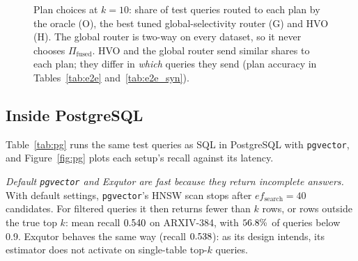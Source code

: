 \documentclass[sigconf,nonacm]{acmart}
\newcommand{\Ppre}{\Pi_{\text{pre}}}
\newcommand{\Pfus}{\Pi_{\text{fused}}}
\newcommand{\Ppost}{\Pi_{\text{post}}}
\begin{document}
\begin{figure}[!t]
\centering
{}
\caption{Plan choices at $k=10$: share of test queries routed to each plan by the oracle (O), the best tuned global-selectivity router (G) and HVO (H). The global router is two-way on every dataset, so it never chooses $\Pfus$. HVO and the global router send similar shares to each plan; they differ in \emph{which} queries they send (plan accuracy in Tables~\ref{tab:e2e} and~\ref{tab:e2e_syn}).}
\label{fig:split}
\end{figure}

\subsection{Inside PostgreSQL}\label{sec:eval_pg}
Table~\ref{tab:pg} runs the same test queries as SQL in PostgreSQL with \texttt{pgvector}, and Figure~\ref{fig:pg} plots each setup's recall against its latency.

\emph{Default \texttt{pgvector} and Exqutor are fast because they return incomplete answers.} With default settings, \texttt{pgvector}'s HNSW scan stops after $ef_{\text{search}}=40$ candidates. For filtered queries it then returns fewer than $k$ rows, or rows outside the true top $k$: mean recall $0.540$ on ARXIV-384, with $56.8\%$ of queries below 0.9. Exqutor behaves the same way (recall $0.538$): as its design intends, its estimator does not activate on single-table top-$k$ queries.
\end{document}
